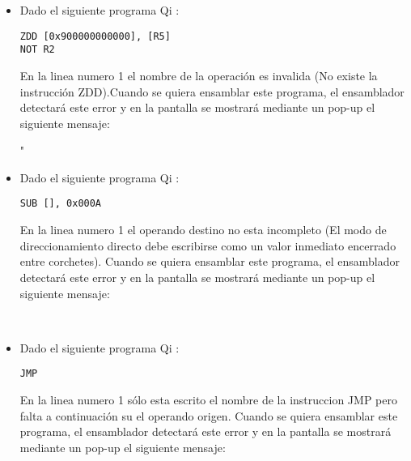 \begin{itemize}
 \\ 

\item Dado el siguiente programa Qi  :\\

\begin{verbatim}
ZDD [0x900000000000], [R5]
NOT R2
\end{verbatim}

En la linea numero 1 el nombre de la operación es invalida (No existe la instrucción ZDD).Cuando se quiera ensamblar este programa, el ensamblador detectará este error y en la pantalla se mostrará mediante un pop-up el siguiente mensaje:

" \\

\item Dado el siguiente programa Qi  :\\

\begin{verbatim}
SUB [], 0x000A
\end{verbatim}

En la linea numero 1 el operando destino no esta incompleto (El modo de direccionamiento directo debe escribirse como un valor inmediato encerrado entre corchetes). Cuando se quiera ensamblar este programa, el ensamblador detectará este error y en la pantalla se mostrará mediante un pop-up el siguiente mensaje:

 \\

\item Dado el siguiente programa Qi  :\\

\begin{verbatim}
JMP
\end{verbatim}

En la linea numero 1 sólo esta escrito el nombre de la instruccion JMP pero falta a continuación su el operando origen. Cuando se quiera ensamblar este programa, el ensamblador detectará este error y en la pantalla se mostrará mediante un pop-up el siguiente mensaje:

 \\
 

\end{itemize}